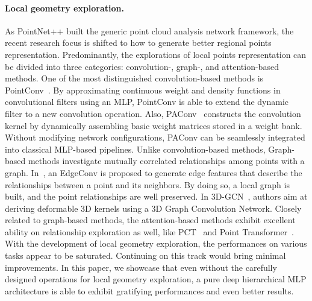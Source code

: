 \paragraph{Local geometry exploration.} As PointNet++ built the generic point cloud analysis network framework, the recent research focus is shifted to how to generate better regional points representation. Predominantly, the explorations of local points representation can be divided into three categories: convolution-, graph-, and attention-based methods. One of the most distinguished convolution-based methods is PointConv~\citep{wu2019pointconv}. By approximating continuous weight and density functions in convolutional filters using an MLP, PointConv is able to extend the dynamic filter to a new convolution operation. Also, PAConv~\citep{xu2021paconv} constructs the convolution kernel by dynamically assembling basic weight matrices stored in a weight bank. Without modifying network configurations, PAConv can be seamlessly integrated into classical MLP-based pipelines. Unlike convolution-based methods, Graph-based methods investigate mutually correlated relationships among points with a graph. In~\citet{wang2019dynamic}, an EdgeConv is proposed to generate edge features that describe the relationships between a point and its neighbors. By doing so, a local graph is built, and the point relationships are well preserved. In 3D-GCN~\citep{lin2021learning}, authors aim at deriving deformable 3D kernels using a 3D Graph Convolution Network. Closely related to graph-based methods, the attention-based methods exhibit excellent ability on relationship exploration as well, like PCT~\citep{guo2021pct} and Point Transformer~\citep{zhao2021point,engel2020point}.
With the development of local geometry exploration, the performances on various tasks appear to be saturated. Continuing on this track would bring minimal improvements. In this paper, we showcase that even without the carefully designed operations for local geometry exploration, a pure deep hierarchical MLP architecture is able to exhibit gratifying performances and even better results. 

